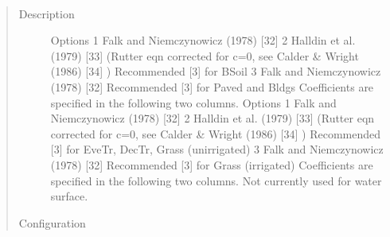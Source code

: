 \documentclass[letterpaper,10pt,english]{sphinxmanual}
\begin{document}
\begin{fulllineitems}
\begin{quote}
\begin{description}
\end{description}\end{quote}

\end{fulllineitems}


\begin{fulllineitems}
\label{\detokenize{input_files/SUEWS_SiteInfo/Input_Options:cmdoption-arg-drainageeq}}~\begin{quote}\begin{description}
\item[{Description}] \leavevmode
Options 1 Falk and Niemczynowicz (1978) {[}32{]} 2 Halldin et al. (1979) {[}33{]} (Rutter eqn corrected for c=0, see Calder \& Wright (1986) {[}34{]} ) Recommended {[}3{]} for BSoil 3 Falk and Niemczynowicz (1978) {[}32{]} Recommended {[}3{]} for Paved and Bldgs Coefficients are specified in the following two columns. Options 1 Falk and Niemczynowicz (1978) {[}32{]} 2 Halldin et al. (1979) {[}33{]} (Rutter eqn corrected for c=0, see Calder \& Wright (1986) {[}34{]} ) Recommended {[}3{]} for EveTr, DecTr, Grass (unirrigated) 3 Falk and Niemczynowicz (1978) {[}32{]} Recommended {[}3{]} for Grass (irrigated) Coefficients are specified in the following two columns. Not currently used for water surface.

\item[{Configuration}] \leavevmode


\end{description}
\end{quote}
\end{fulllineitems}
\end{document}
